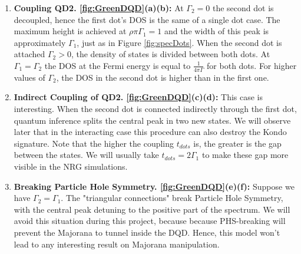 \begin{enumerate}
    \item \textbf{Coupling QD2. \ref{fig:GreenDQD}(a)(b):}  At $\Gamma_2=0$  the second dot is decoupled, hence the first dot's DOS is the same of a single dot case. The maximum height is achieved at  $\rho \pi \Gamma_1 =1$ and the width of this peak is approximately  $\Gamma_1$, just as in Figure \ref{fig:specDots}. When the second dot is attached $\Gamma_2 >0$, the density of states is divided between both dots. At $\Gamma_1 = \Gamma_2$ the DOS at the Fermi energy is equal to $\frac{1}{4\pi\Gamma}$ for both dots. For higher values of $\Gamma_2$, the DOS in the second dot is higher than in the first one.  
    
 

    \item \textbf{Indirect Coupling of QD2. \ref{fig:GreenDQD}(c)(d):} This case is interesting. When the second dot is connected indirectly through the first dot, quantum inference splits the central peak in two new states. We will observe later that in the interacting case this procedure can also destroy the Kondo signature. Note that the higher the coupling $t_{dots}$ is, the greater is the gap between the states. We will usually take $t_{dots} = 2\Gamma_1$ to make these gap more visible in the NRG simulations. 
    \item \textbf{Breaking Particle Hole Symmetry. \ref{fig:GreenDQD}(e)(f):}
    Suppose we have $\Gamma_2 = \Gamma_1$. The "triangular connections" break Particle Hole Symmetry, with the central peak detuning to the positive part of the spectrum. We will avoid this situation during this project, because because PHS-breaking  will prevent the Majorana to tunnel inside the DQD. Hence, this model won't lead to any interesting result on Majorana manipulation. 
\end{enumerate}



    














